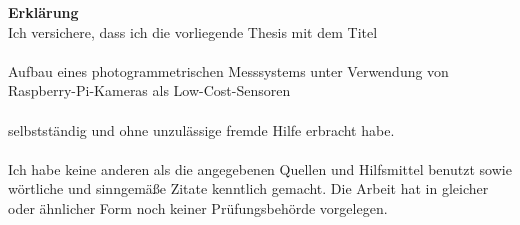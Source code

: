 \documentclass[a4paper,12pt,bibliography=totoc, listof=totoc, titlepage]{scrreprt}
\begin{document}
\tableofcontents
\newpage

\setcounter{page}{1}

















\clearpage

\printglossaries

\clearpage
\renewcommand\UrlFont\itshape
\renewcommand{\refname}{Literaturverzeichnis}

\listoffigures
\listoftables


\renewcommand{\appendixpagename}{\appendixname}
\renewcommand{\appendixtocname}{\appendixname}
\begin{appendices}
    
    
    
    
\end{appendices}

\clearpage
\thispagestyle{empty}
\noindent\textbf{\large Erklärung}\\
Ich versichere, dass ich die vorliegende Thesis mit dem Titel\\
\\
Aufbau eines photogrammetrischen Messsystems unter Verwendung von Raspberry-Pi-Kameras als Low-Cost-Sensoren\\
\\
selbstständig und ohne unzulässige fremde Hilfe erbracht habe.\\
\\
Ich habe keine anderen als die angegebenen Quellen und Hilfsmittel benutzt sowie wörtliche und
sinngemäße Zitate kenntlich gemacht. Die Arbeit hat in gleicher oder ähnlicher Form
noch keiner Prüfungsbehörde vorgelegen.
\\
\\
\\
\\
\end{document}
